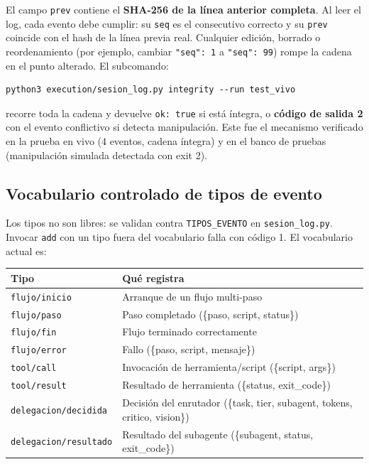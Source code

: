 \documentclass[11pt,a4paper]{article}
\begin{document}
El campo \texttt{prev} contiene el \textbf{SHA-256 de la línea anterior completa}. Al
leer el log, cada evento debe cumplir: su \texttt{seq} es el consecutivo correcto y su
\texttt{prev} coincide con el hash de la línea previa real. Cualquier edición, borrado o
reordenamiento (por ejemplo, cambiar \texttt{"seq": 1} a \texttt{"seq": 99}) rompe la
cadena en el punto alterado. El subcomando:

\begin{lstlisting}
python3 execution/sesion_log.py integrity --run test_vivo
\end{lstlisting}

recorre toda la cadena y devuelve \texttt{ok: true} si está íntegra, o \textbf{código de
salida 2} con el evento conflictivo si detecta manipulación. Este fue el mecanismo
verificado en la prueba en vivo (4 eventos, cadena íntegra) y en el banco de pruebas
(manipulación simulada detectada con exit 2).

\subsection{Vocabulario controlado de tipos de evento}

Los tipos no son libres: se validan contra \texttt{TIPOS\_EVENTO} en
\texttt{sesion\_log.py}. Invocar \texttt{add} con un tipo fuera del vocabulario falla con
código 1. El vocabulario actual es:

\begin{tcolorbox}[tarjetaIcono, title={\faIcon{tags}~TIPOS\_EVENTO}]
\begin{tabularx}{\linewidth}{@{}l X@{}}
\toprule
\textbf{Tipo} & \textbf{Qué registra} \\
\midrule
\texttt{flujo/inicio} & Arranque de un flujo multi-paso \\
\texttt{flujo/paso} & Paso completado (\{paso, script, status\}) \\
\texttt{flujo/fin} & Flujo terminado correctamente \\
\texttt{flujo/error} & Fallo (\{paso, script, mensaje\}) \\
\texttt{tool/call} & Invocación de herramienta/script (\{script, args\}) \\
\texttt{tool/result} & Resultado de herramienta (\{status, exit\_code\}) \\
\texttt{delegacion/decidida} & Decisión del enrutador (\{task, tier, subagent, tokens, critico, vision\}) \\
\texttt{delegacion/resultado} & Resultado del subagente (\{subagent, status, exit\_code\}) \\
\bottomrule
\end{tabularx}
\end{tcolorbox}
\end{document}
